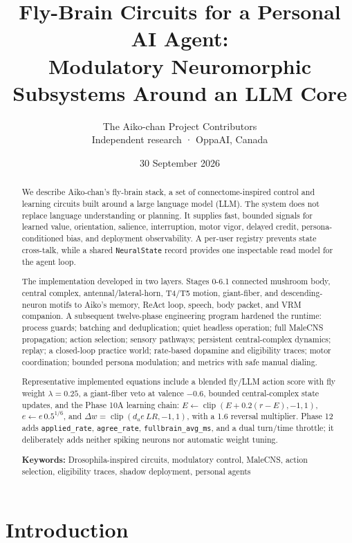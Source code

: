 \documentclass[11pt]{article}
\title{Fly-Brain Circuits for a Personal AI Agent:\\ Modulatory Neuromorphic Subsystems Around an LLM Core}
\author{The Aiko-chan Project Contributors\\\small Independent research · OppaAI, Canada}
\date{30 September 2026}
\begin{document}
\maketitle
\begin{abstract}
We describe Aiko-chan's fly-brain stack, a set of connectome-inspired control and learning circuits built around a large language model (LLM). The system does not replace language understanding or planning. It supplies fast, bounded signals for learned value, orientation, salience, interruption, motor vigor, delayed credit, persona-conditioned bias, and deployment observability. A per-user registry prevents state cross-talk, while a shared \texttt{NeuralState} record provides one inspectable read model for the agent loop.

The implementation developed in two layers. Stages 0-6.1 connected mushroom body, central complex, antennal/lateral-horn, T4/T5 motion, giant-fiber, and descending-neuron motifs to Aiko's memory, ReAct loop, speech, body packet, and VRM companion. A subsequent twelve-phase engineering program hardened the runtime: process guards; batching and deduplication; quiet headless operation; full MaleCNS propagation; action selection; sensory pathways; persistent central-complex dynamics; replay; a closed-loop practice world; rate-based dopamine and eligibility traces; motor coordination; bounded persona modulation; and metrics with safe manual dialing.

Representative implemented equations include a blended fly/LLM action score with fly weight \(\lambda=0.25\), a giant-fiber veto at valence \(-0.6\), bounded central-complex state updates, and the Phase 10A learning chain: \(E\leftarrow\operatorname{clip}(E+0.2(r-E),-1,1)\), \(e\leftarrow e\,0.5^{1/6}\), and \(\Delta w=\operatorname{clip}(d_a e\,LR,-1,1)\), with a 1.6 reversal multiplier. Phase 12 adds \texttt{applied\_rate}, \texttt{agree\_rate}, \texttt{fullbrain\_avg\_ms}, and a dual turn/time throttle; it deliberately adds neither spiking neurons nor automatic weight tuning.

\medskip\noindent \textbf{Keywords:} Drosophila-inspired circuits, modulatory control, MaleCNS, action selection, eligibility traces, shadow deployment, personal agents
\end{abstract}
\tableofcontents
\clearpage

\section{Introduction}
\end{document}
